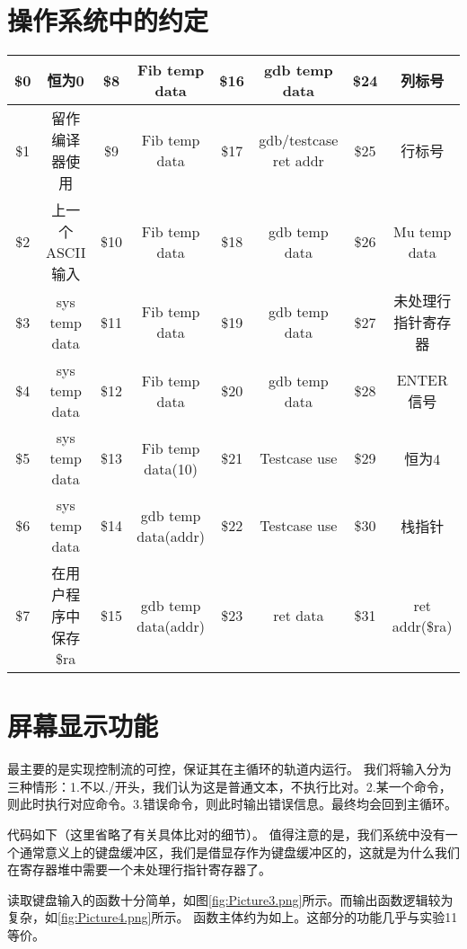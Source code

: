 \section{操作系统中的约定}
    \hspace{-3cm}
    \begin{tabular}{|*{8}{c|}}
    \hline
    \$0 & 恒为0 & \$8 & Fib temp data & \$16 & gdb temp data & \$24 & 列标号 \\ \hline
    \$1	& 留作编译器使用 & \$9 & Fib temp data & \$17 & gdb/testcase ret addr &	\$25 & 行标号\\ \hline
    \$2	& 上一个ASCII输入 &	\$10 & Fib temp data &\$18 & gdb temp data &\$26 & Mu temp data \\ \hline
    \$3	& sys temp data	& \$11 & Fib temp data & \$19 & gdb temp data & \$27 & 未处理行指针寄存器 \\ \hline
    \$4 & sys temp data	& \$12 & Fib temp data &\$20 & gdb temp data & \$28 & ENTER信号\\ \hline
    \$5	 & sys temp data & \$13 & Fib temp data(10) & \$21 &	Testcase use & \$29 & 恒为4\\ \hline
    \$6 & sys temp data & \$14 & gdb temp data(addr) & \$22 & Testcase use & \$30 & 栈指针\\ \hline
    \$7  & 在用户程序中保存\$ra & \$15 & gdb temp data(addr) & \$23 & ret data & \$31 & ret addr(\$ra)\\ \hline
    \end{tabular}
\section{屏幕显示功能}
    最主要的是实现控制流的可控，保证其在主循环的轨道内运行。
    我们将输入分为三种情形：1.不以./开头，我们认为这是普通文本，不执行比对。2.某一个命令，则此时执行对应命令。3.错误命令，则此时输出错误信息。最终均会回到主循环。\par
    代码如下（这里省略了有关具体比对的细节）。
    值得注意的是，我们系统中没有一个通常意义上的键盘缓冲区，我们是借显存作为键盘缓冲区的，这就是为什么我们在寄存器堆中需要一个未处理行指针寄存器了。\par 
    读取键盘输入的函数十分简单，如图\ref{fig:Picture3.png}所示。而输出函数逻辑较为复杂，如\ref{fig:Picture4.png}所示。
    函数主体约为如上。这部分的功能几乎与实验11等价。

\clearpage

